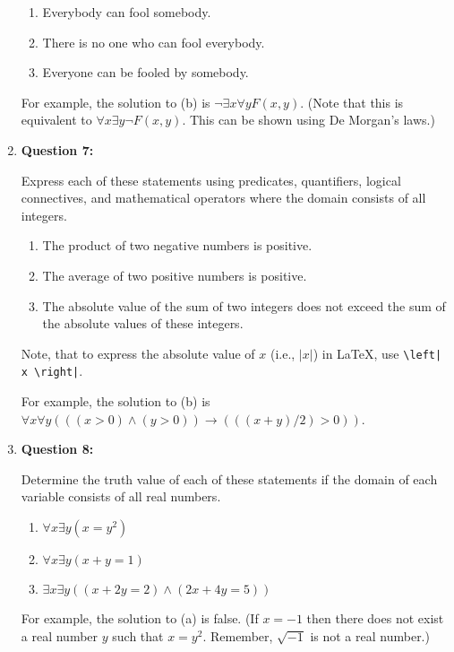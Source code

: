 \documentclass[11pt]{article}
\begin{document}
\begin{enumerate}
\begin{enumerate}[label=(\alph*)]
\item Everybody can fool somebody.
\item There is no one who can fool everybody.
\item Everyone can be fooled by somebody.
\end{enumerate}

For example, the solution to (b) is $\lnot \exists x \forall y F(x,y)$. (Note that this is equivalent to $\forall x \exists y \lnot F(x,y)$. This can be shown using De Morgan's laws.)

\item
\textbf{Question 7:}

Express each of these statements using predicates, quantifiers, logical connectives, and mathematical operators where the domain consists of all integers.

\begin{enumerate}[label=(\alph*)]
\item The product of two negative numbers is positive.
\item The average of two positive numbers is positive.
\item The absolute value of the sum of two integers does not exceed the sum of the absolute values of these integers.
\end{enumerate}

Note, that to express the absolute value of $x$ (i.e., $\left| x \right|$) in LaTeX, use \verb!\left| x \right|!.

For example, the solution to (b) is $\forall x \forall y (((x>0) \land (y>0)) \rightarrow (((x+y)/2)>0))$.

\item
\textbf{Question 8:}

Determine the truth value of each of these statements if the domain of each variable consists of all real numbers.

\begin{enumerate}[label=(\alph*)]
\item $\forall x \exists y (x=y^2)$
\item $\forall x \exists y (x+y=1)$
\item $\exists x \exists y ((x+2y=2) \land (2x+4y=5))$
\end{enumerate}

For example, the solution to (a) is false. (If $x=-1$ then there does not exist a real number $y$ such that $x=y^2$. Remember, $\sqrt{-1}$ is not a real number.)

\end{enumerate}
\end{document}
